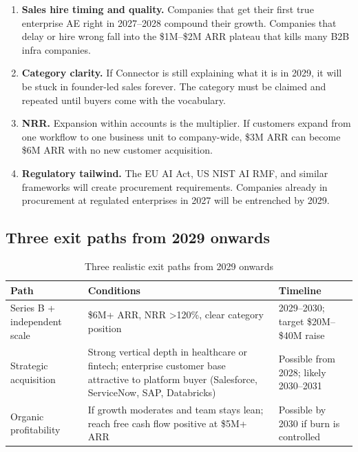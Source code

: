 \begin{enumerate}[leftmargin=1.8em,itemsep=3pt]
  \item \textbf{Sales hire timing and quality.} Companies that get their first
        true enterprise AE right in 2027--2028 compound their growth. Companies
        that delay or hire wrong fall into the \$1M--\$2M ARR plateau that
        kills many B2B infra companies.
  \item \textbf{Category clarity.} If Connector is still explaining what it is
        in 2029, it will be stuck in founder-led sales forever. The category
        must be claimed and repeated until buyers come with the vocabulary.
  \item \textbf{NRR.} Expansion within accounts is the multiplier. If customers
        expand from one workflow to one business unit to company-wide, \$3M ARR
        can become \$6M ARR with no new customer acquisition.
  \item \textbf{Regulatory tailwind.} The EU AI Act, US NIST AI RMF, and similar
        frameworks will create procurement requirements. Companies already in
        procurement at regulated enterprises in 2027 will be entrenched by 2029.
\end{enumerate}

\subsection{Three exit paths from 2029 onwards}

\begin{table}[H]
\centering
\renewcommand{\arraystretch}{1.45}
\begin{tabularx}{\textwidth}{@{}lXX@{}}
\toprule
\textbf{Path} & \textbf{Conditions} & \textbf{Timeline} \\
\midrule
Series B + independent scale & \$6M+ ARR, NRR \textgreater{}120\%, clear category position & 2029--2030; target \$20M--\$40M raise \\
Strategic acquisition & Strong vertical depth in healthcare or fintech; enterprise customer base attractive to platform buyer (Salesforce, ServiceNow, SAP, Databricks) & Possible from 2028; likely 2030--2031 \\
Organic profitability & If growth moderates and team stays lean; reach free cash flow positive at \$5M+ ARR & Possible by 2030 if burn is controlled \\
\bottomrule
\end{tabularx}
\caption{Three realistic exit paths from 2029 onwards}
\end{table}

